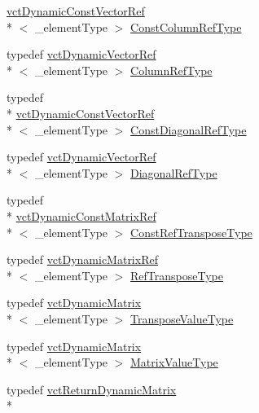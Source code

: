 \begin{DoxyCompactItemize}
\hyperlink{classvct_dynamic_const_vector_ref}{vct\-Dynamic\-Const\-Vector\-Ref}\\*
$<$ \-\_\-element\-Type $>$ \hyperlink{classvct_dynamic_const_matrix_base_ac8caf37f979246b1ae99d6e6876879e0}{Const\-Column\-Ref\-Type}
\item 
typedef \hyperlink{classvct_dynamic_vector_ref}{vct\-Dynamic\-Vector\-Ref}\\*
$<$ \-\_\-element\-Type $>$ \hyperlink{classvct_dynamic_const_matrix_base_a232026578d12a51aa5228dee998b5663}{Column\-Ref\-Type}
\item 
typedef \\*
\hyperlink{classvct_dynamic_const_vector_ref}{vct\-Dynamic\-Const\-Vector\-Ref}\\*
$<$ \-\_\-element\-Type $>$ \hyperlink{classvct_dynamic_const_matrix_base_aa497314340719c9e70a4991d3f306d7e}{Const\-Diagonal\-Ref\-Type}
\item 
typedef \hyperlink{classvct_dynamic_vector_ref}{vct\-Dynamic\-Vector\-Ref}\\*
$<$ \-\_\-element\-Type $>$ \hyperlink{classvct_dynamic_const_matrix_base_a2773e894d2ce8aa7a479eeecc535ac33}{Diagonal\-Ref\-Type}
\item 
typedef \\*
\hyperlink{classvct_dynamic_const_matrix_ref}{vct\-Dynamic\-Const\-Matrix\-Ref}\\*
$<$ \-\_\-element\-Type $>$ \hyperlink{classvct_dynamic_const_matrix_base_a2ee053ef5a591f470076e2a0c215fa44}{Const\-Ref\-Transpose\-Type}
\item 
typedef \hyperlink{classvct_dynamic_matrix_ref}{vct\-Dynamic\-Matrix\-Ref}\\*
$<$ \-\_\-element\-Type $>$ \hyperlink{classvct_dynamic_const_matrix_base_afff0f3bee56a8562e0ec772b35e24475}{Ref\-Transpose\-Type}
\item 
typedef \hyperlink{classvct_dynamic_matrix}{vct\-Dynamic\-Matrix}\\*
$<$ \-\_\-element\-Type $>$ \hyperlink{classvct_dynamic_const_matrix_base_aae6fde8d869581c6de1f1cbe7f17c588}{Transpose\-Value\-Type}
\item 
typedef \hyperlink{classvct_dynamic_matrix}{vct\-Dynamic\-Matrix}\\*
$<$ \-\_\-element\-Type $>$ \hyperlink{classvct_dynamic_const_matrix_base_ad7a2deb73c9de7bbea753cee80fb2ada}{Matrix\-Value\-Type}
\item 
typedef \hyperlink{classvct_return_dynamic_matrix}{vct\-Return\-Dynamic\-Matrix}\\*

\end{DoxyCompactItemize}
